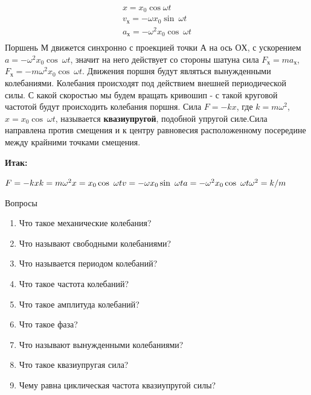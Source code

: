 \documentclass[a5paper, 10pt]{diss_4}
\renewcommand{\'}{\,'}
\begin{document}
 \\
\begin{gather*}
x = x_0\cos\omega t\\
v_х = -\omega x_0\sin\ \omega t\\
a_х= -\omega^2x_0\cos\ \omega t\\
\end{gather*}
Поршень $М$ движется синхронно с проекцией точки $А$ на ось $ОХ$, с ускорением  $a= -\omega^2x_0\cos\ \omega t$, значит на него действует со стороны шатуна сила $F_х=ma_х$, $F_х= -m\omega^2x_0\cos\ \omega t$. Движения поршня будут являться вынужденными колебаниями. Колебания происходят под действием внешней периодической силы. С какой скоростью мы будем вращать кривошип - с такой круговой частотой будут происходить колебания поршня. Сила $F= -kx$, где $k=m\omega^2$, $x=x_0\cos\ \omega t$,  называется
\textbf{квазиупругой}, подобной упругой силе.Сила направлена против смещения и к центру равновесия расположенному посередине между крайними точками смещения.

\textbf{Итак:}\hspace{.3cm}
\parbox[t]{15cm}{
$
F=-kx\\
k=m\omega^2\\
x=x_0\cos\ \omega t\\
v = -\omega x_0\sin\ \omega t\\
a= -\omega^2x_0\cos\ \omega t\\
\omega^2=k/m\\
$
}

\begin{center}
   Вопросы
\end{center}
\begin{enumerate}

\item Что такое механические колебания?
\item Что называют свободными колебаниями?
\item Что называется периодом колебаний?
\item Что такое частота колебаний?
\item Что такое амплитуда колебаний?
\item Что такое фаза?
\item Что называют вынужденными колебаниями?
\item Что такое квазиупругая сила?
\item Чему равна циклическая частота квазиупругой силы?

\end{enumerate}
\end{document}
